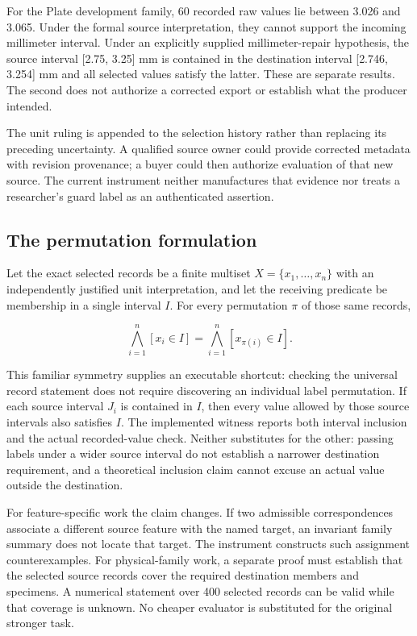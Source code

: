 \documentclass[
  11pt,
]{article}
\let\OriginalSubsection\subsection
\renewcommand{\subsection}{\needspace{6\baselineskip}\OriginalSubsection}
\begin{document}
For the Plate development family, 60 recorded raw values lie between
3.026 and 3.065. Under the formal source interpretation, they cannot
support the incoming millimeter interval. Under an explicitly supplied
millimeter-repair hypothesis, the source interval {[}2.75, 3.25{]} mm is
contained in the destination interval {[}2.746, 3.254{]} mm and all
selected values satisfy the latter. These are separate results. The
second does not authorize a corrected export or establish what the
producer intended.

The unit ruling is appended to the selection history rather than
replacing its preceding uncertainty. A qualified source owner could
provide corrected metadata with revision provenance; a buyer could then
authorize evaluation of that new source. The current instrument neither
manufactures that evidence nor treats a researcher's guard label as an
authenticated assertion.

\hypertarget{the-permutation-formulation}{%
\subsection{The permutation
formulation}\label{the-permutation-formulation}}

Let the exact selected records be a finite multiset
\(X=\{x_1,\ldots,x_n\}\) with an independently justified unit
interpretation, and let the receiving predicate be membership in a
single interval \(I\). For every permutation \(\pi\) of those same
records,

\[
\bigwedge_{i=1}^{n}[x_i\in I]
=\bigwedge_{i=1}^{n}[x_{\pi(i)}\in I].
\]

This familiar symmetry supplies an executable shortcut: checking the
universal record statement does not require discovering an individual
label permutation. If each source interval \(J_i\) is contained in
\(I\), then every value allowed by those source intervals also satisfies
\(I\). The implemented witness reports both interval inclusion and the
actual recorded-value check. Neither substitutes for the other: passing
labels under a wider source interval do not establish a narrower
destination requirement, and a theoretical inclusion claim cannot excuse
an actual value outside the destination.

For feature-specific work the claim changes. If two admissible
correspondences associate a different source feature with the named
target, an invariant family summary does not locate that target. The
instrument constructs such assignment counterexamples. For
physical-family work, a separate proof must establish that the selected
source records cover the required destination members and specimens. A
numerical statement over 400 selected records can be valid while that
coverage is unknown. No cheaper evaluator is substituted for the
original stronger task.
\end{document}
